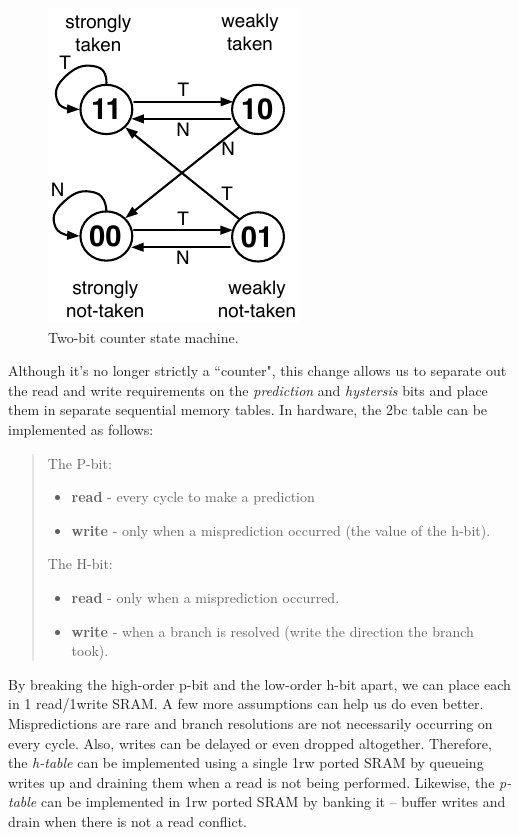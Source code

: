 \begin{figure}[ht]
	\centering
	\centerline{\includegraphics[scale =1] {figures/2bc-fsm}}
	\caption{ \small Two-bit counter state machine.}
	\label{fig:2bc-fsm}
\end{figure}

Although it's no longer strictly a ``counter", this change allows us to separate out the read and write requirements on the {\em prediction} and {\em hystersis} bits and place them in separate sequential memory tables. In hardware, the 2bc table can be implemented as follows:

\begin{quote}
The P-bit:
\begin{itemize}
\item {\bf read} - every cycle to make a prediction
\item {\bf write} - only when a misprediction occurred (the value of the h-bit).
\end{itemize}

The H-bit:

\begin{itemize}
\item {\bf read} - only when a misprediction occurred.
\item {\bf write} - when a branch is resolved (write the direction the branch took).
\end{itemize}
\end{quote}

By breaking the high-order p-bit and the low-order h-bit apart, we can place each in 1 read/1write SRAM. A few more assumptions can help us do even better. Mispredictions are rare and branch resolutions are not necessarily occurring on every cycle. Also, writes can be delayed or even dropped altogether. Therefore, the {\em h-table} can be implemented using a single 1rw ported SRAM by queueing writes up and draining them when a read is not being performed. Likewise, the {\em p-table} can be implemented in 1rw ported SRAM by banking it -- buffer writes and drain when there is not a read conflict.



